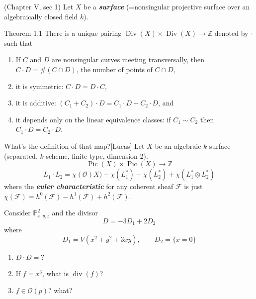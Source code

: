 (Chapter V, sec 1) Let $X$ be a \textit{\textbf{surface}} (=nonsingular projective surface over an algebraically closed field  $k$).

\begin{thing4}{Theorem 1.1}\leavevmode
	There is a unique pairing $\operatorname{Div}(X)\times \operatorname{Div}(X)\to\mathbb{Z}$ denoted by $\cdot$ such that
	\begin{enumerate}
	\item If $C$ and $D$ are nonsingular curves meeting transversally, then $C\cdot D=\#(C\cap D)$, the number of points of $C \cap D$,
\item it is symmetric: $C\cdot D=D\cdot C$,
\item it is additive: $(C_1+C_2)\cdot D=C_1\cdot D+C_2\cdot D$, and 
\item it depends only on the linear equivalence classes: if $C_1\sim C_2$ then $C_1\cdot D=C_2\cdot D$. 
\end{enumerate}
\end{thing4}

\begin{thing4}{What's the definition of that map?}[Lucas]\leavevmode
	Let $X$ be an algebraic $k$-surface (separated, $k$-scheme, finite type, dimension 2).
	\[\operatorname{Pic}(X) \times\operatorname{Pic}(X) \longrightarrow\mathbb{Z}\]
	\[L_1\cdot L_2=\chi(\mathcal{O})X)-\chi(L_1^*)-\chi(L_2^*)+\chi(L_1^*\otimes L_2^*)\]
	where the \textit{\textbf{euler characteristic}} for any coherent sheaf  $\mathcal{F}$ is just $\chi(\mathcal{F})=h^0(\mathcal{F})-h^1(\mathcal{F})+h^2(\mathcal{F})$.
\end{thing4}

\begin{exercise}\leavevmode
Consider $\mathbb{P}^2_{x,y,z}$ and the divisor \[D=-3D_1+2D_2\]
where
\[D_1=V(x^2+y^2+3xy),\qquad D_2=\{x=0\}\]
\begin{enumerate}[label=\alph*.]
\item $D\cdot D=?$ 
\item If $f=x^3$, what is $\operatorname{div}(f)$?
\item $f\in\mathcal{O}(p)$? what? 
\end{enumerate}
\end{exercise}


